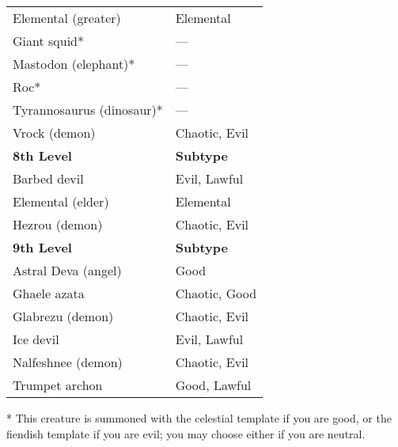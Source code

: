 \begin{tabular}{ll}
Elemental (greater)       & Elemental        \\
Giant squid*              & ---                \\
Mastodon (elephant)*      & ---                \\
Roc*                      & ---                \\
Tyrannosaurus (dinosaur)* & ---                \\
Vrock (demon)             & Chaotic, Evil    \\
\textbf{8th Level}        & \textbf{Subtype} \\
Barbed devil              & Evil, Lawful     \\
Elemental (elder)         & Elemental        \\
Hezrou (demon)            & Chaotic, Evil    \\
\textbf{9th Level}        & \textbf{Subtype} \\
Astral Deva (angel)       & Good             \\
Ghaele azata              & Chaotic, Good    \\
Glabrezu (demon)          & Chaotic, Evil    \\
Ice devil                 & Evil, Lawful     \\
Nalfeshnee (demon)        & Chaotic, Evil    \\
Trumpet archon            & Good, Lawful     \\
\end{tabular}
* This creature is summoned with the celestial template if you are good, or the fiendish template if you are evil; you may choose either if you are neutral.


